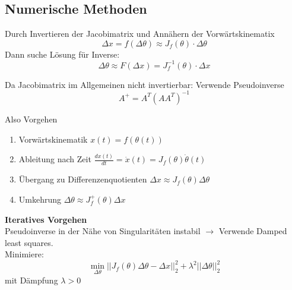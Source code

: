 \subsection{Numerische Methoden}
Durch Invertieren der Jacobimatrix und Annähern der Vorwärtskinematix
\[\Delta x = f(\Delta \theta) \approx J_f(\theta) \cdot \Delta \theta\]
Dann suche Lösung für Inverse:
\[\Delta \theta \approx F(\Delta x) = J_f^{-1}(\theta) \cdot \Delta x\]

Da Jacobimatrix im Allgemeinen nicht invertierbar: Verwende Pseudoinverse
\[A^+ = A^T{(AA^T)}^{-1}\]

Also Vorgehen
\begin{enumerate}
\item Vorwärtskinematik \(x(t) = f(\theta(t))\)
\item Ableitung nach Zeit \(\frac{dx(t)}{dt} = \dot{x}(t) = J_f(\theta)\dot{\theta}(t)\)
\item Übergang zu Differenzenquotienten \(\Delta x \approx J_f(\theta)\Delta\theta\)
\item Umkehrung \(\Delta\theta \approx J_f^+(\theta)\Delta x\)
\end{enumerate}

\textbf{Iteratives Vorgehen}\\
Pseudoinverse in der Nähe von Singularitäten instabil \(\rightarrow\) Verwende Damped least squares.\\
Minimiere:
\[\min_{\Delta\theta}||J_f(\theta)\Delta\theta - \Delta x||^2_2 + \lambda^2||\Delta\theta||^2_2\]
mit Dämpfung \(\lambda > 0\)